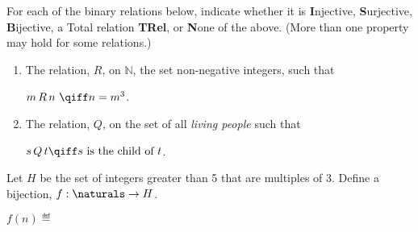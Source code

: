 \documentclass[quiz]{mcs}
\begin{document}
\inhandout{\instatements{\newpage}}




\begin{problem}[2]
For each of the binary relations below, indicate whether it is
\textbf{I}njective, \textbf{S}urjective, \textbf{B}ijective, a Total relation
\textbf{TRel}, or \textbf{N}one of the above.  (More than one property may
hold for some relations.)

\begin{enumerate}

\item The relation, $R$, on $\mathbb{N}$,
the set non-negative integers, such that

$m\, R\, n\ \qiff n=m^3$. \hfill \brule{1.5in}


\item The relation, $Q$, on the set of all {\it living people}
such that

$s\, Q\, t  \qiff s \text{ is the child of } t$.
\hfill\brule{1.5in}


\end{enumerate}

\end{problem}


\iffalse
\fi

\begin{problem}[2]  Let $H$ be the set of integers greater than 5 that are
multiples of 3.  Define a bijection, $f:\naturals \to H$.

$f(n) \eqdef$ \brule{2in}


\end{problem}
\end{document}
